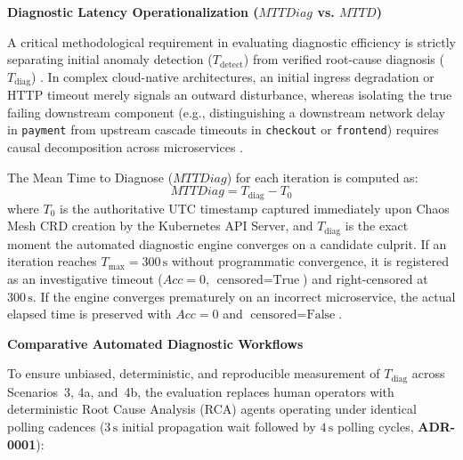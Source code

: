 \textbf{Diagnostic Latency Operationalization ($MTTDiag$ vs. $MTTD$)}

A critical methodological requirement in evaluating diagnostic efficiency is strictly separating initial anomaly detection ($T_{\text{detect}}$) from verified root-cause diagnosis ($T_{\text{diag}}$) \cite{wang_2024}. In complex cloud-native architectures, an initial ingress degradation or HTTP timeout merely signals an outward disturbance, whereas isolating the true failing downstream component (e.g., distinguishing a downstream network delay in \texttt{payment} from upstream cascade timeouts in \texttt{checkout} or \texttt{frontend}) requires causal decomposition across microservices \cite{barata_2026}.

The Mean Time to Diagnose ($MTTDiag$) for each iteration is computed as:
\begin{equation}
    MTTDiag = T_{\text{diag}} - T_0
\end{equation}
where $T_0$ is the authoritative UTC timestamp captured immediately upon Chaos Mesh CRD creation by the Kubernetes API Server, and $T_{\text{diag}}$ is the exact moment the automated diagnostic engine converges on a candidate culprit. If an iteration reaches $T_{\text{max}} = 300\,\text{s}$ without programmatic convergence, it is registered as an investigative timeout ($Acc = 0$, $\text{censored} = \text{True}$) and right-censored at $300\,\text{s}$. If the engine converges prematurely on an incorrect microservice, the actual elapsed time is preserved with $Acc = 0$ and $\text{censored} = \text{False}$.

\textbf{Comparative Automated Diagnostic Workflows}

To ensure unbiased, deterministic, and reproducible measurement of $T_{\text{diag}}$ across Scenarios~3, 4a, and~4b, the evaluation replaces human operators with deterministic Root Cause Analysis (RCA) agents \cite{wang_2024, barata_2026} operating under identical polling cadences ($3\,\text{s}$ initial propagation wait followed by $4\,\text{s}$ polling cycles, \textbf{ADR-0001}):

